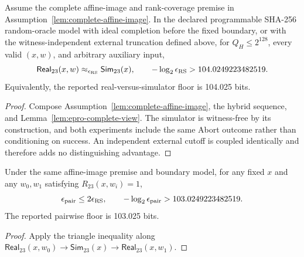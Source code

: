 \begin{theorem}
\label{thm:real-vs-sim23}
Assume the complete affine-image and rank-coverage premise in
Assumption~\ref{lem:complete-affine-image}.  In the declared programmable
SHA-256 random-oracle model with ideal completion before the fixed boundary,
or with the witness-independent external truncation defined above, for
\(Q_H\le2^{128}\), every valid \((x,w)\), and arbitrary auxiliary input,
\[
 \mathsf{Real}_{23}(x,w)\approx_{\epsilon_{\rm RS}}
 \mathsf{Sim}_{23}(x),
 \qquad
 -\log_2\epsilon_{\rm RS}>104.0249223482519.
\]
Equivalently, the reported real-versus-simulator floor is 104.025 bits.
\end{theorem}

\begin{proof}
Compose Assumption~\ref{lem:complete-affine-image}, the hybrid sequence, and
Lemma~\ref{lem:epro-complete-view}.  The simulator is witness-free by its
construction, and both experiments include the same Abort outcome rather
than conditioning on success.  An independent external cutoff is coupled
identically and therefore adds no distinguishing advantage.
\end{proof}

\begin{corollary}
\label{cor:pairwise-hiding}
Under the same affine-image premise and boundary model, for any fixed \(x\)
and any \(w_0,w_1\) satisfying \(R_{23}(x,w_i)=1\),
\[
 \epsilon_{\rm pair}\le2\epsilon_{\rm RS},
 \qquad
 -\log_2\epsilon_{\rm pair}>103.0249223482519.
\]
The reported pairwise floor is 103.025 bits.
\end{corollary}

\begin{proof}
Apply the triangle inequality along
\(
 \mathsf{Real}_{23}(x,w_0)\rightarrow
 \mathsf{Sim}_{23}(x)\rightarrow
 \mathsf{Real}_{23}(x,w_1)
\).
\end{proof}
